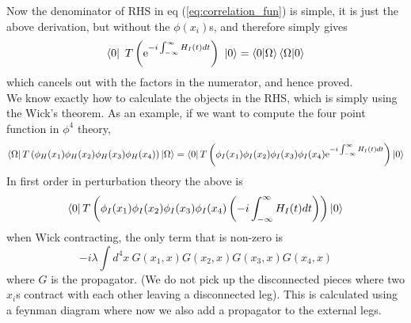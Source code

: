 \documentclass[11pt, notitlepage]{report}
\newcommand{\e}{\mathrm{e}}
\numberwithin{equation}{section}
\begin{document}
Now the denominator of RHS in eq (\ref{eq:correlation_fun}) is simple, it is just the above derivation, but without the \(\phi(x_i)\)s, and therefore simply gives 
\begin{equation*}
    \bra{0}~T\left( \e^{-i\int_{-\infty}^{\infty}H_I(t)dt}\right)~\ket{0} = \braket{0|\Omega}\braket{\Omega|0}
\end{equation*}
which cancels out with the factors in the numerator, and hence proved.\\

We know exactly how to calculate the objects in the RHS, which is simply using the Wick's theorem. As an example, if we want to compute the four point function in \(\phi^4\) theory,
\begin{equation*}
    \bra{\Omega} T\left( \phi_H(x_1)\phi_H(x_2)\phi_H(x_3)\phi_H(x_4) \right)\ket{\Omega} = \bra{0}T\left( \phi_I(x_1)\phi_I(x_2)\phi_I(x_3)\phi_I(x_4) \e^{-i\int_{-\infty}^{\infty}H_I(t) dt } \right) \ket{0}
\end{equation*}
In first order in perturbation theory the above is 
\begin{equation*}
    \bra{0}T\left( \phi_I(x_1)\phi_I(x_2)\phi_I(x_3)\phi_I(x_4) \left(-i\int_{-\infty}^{\infty}H_I(t) dt \right) \right) \ket{0}
\end{equation*}
when Wick contracting, the only term that is non-zero is 
\begin{equation*}
    -i\lambda\int d^4x~ G(x_1, x)G(x_2, x)G(x_3, x)G(x_4, x)
\end{equation*}
where \(G\) is the propagator. (We do not pick up the disconnected pieces where two \(x_i\)s contract with each other leaving a disconnected leg). This is calculated using a feynman diagram where now we also add a propagator to the external legs.

\begin{figure}[h]
    \centering 
\end{figure}
\end{document}
